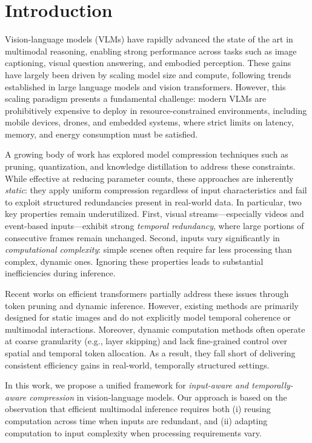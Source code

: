 \documentclass{article}
\begin{document}
\section{Introduction}
Vision-language models (VLMs) have rapidly advanced the state of the art in multimodal reasoning, enabling strong performance across tasks such as image captioning, visual question answering, and embodied perception. These gains have largely been driven by scaling model size and compute, following trends established in large language models and vision transformers. However, this scaling paradigm presents a fundamental challenge: modern VLMs are prohibitively expensive to deploy in resource-constrained environments, including mobile devices, drones, and embedded systems, where strict limits on latency, memory, and energy consumption must be satisfied.

A growing body of work has explored model compression techniques such as pruning, quantization, and knowledge distillation to address these constraints. While effective at reducing parameter counts, these approaches are inherently \emph{static}: they apply uniform compression regardless of input characteristics and fail to exploit structured redundancies present in real-world data. In particular, two key properties remain underutilized. First, visual streams---especially videos and event-based inputs---exhibit strong \emph{temporal redundancy}, where large portions of consecutive frames remain unchanged. Second, inputs vary significantly in \emph{computational complexity}: simple scenes often require far less processing than complex, dynamic ones. Ignoring these properties leads to substantial inefficiencies during inference.

Recent works on efficient transformers partially address these issues through token pruning and dynamic inference. However, existing methods are primarily designed for static images and do not explicitly model temporal coherence or multimodal interactions. Moreover, dynamic computation methods often operate at coarse granularity (e.g., layer skipping) and lack fine-grained control over spatial and temporal token allocation. As a result, they fall short of delivering consistent efficiency gains in real-world, temporally structured settings.

In this work, we propose a unified framework for \emph{input-aware and temporally-aware compression} in vision-language models. Our approach is based on the observation that efficient multimodal inference requires both (i) reusing computation across time when inputs are redundant, and (ii) adapting computation to input complexity when processing requirements vary.
\end{document}
